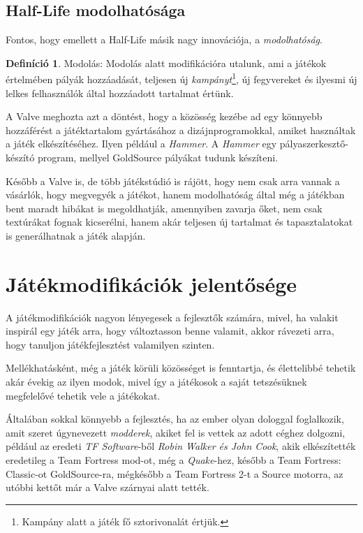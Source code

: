 \documentclass[]{thesis-ekf}
\theoremstyle{definition}
\newtheorem{definicio}{Definíció}[chapter]
\begin{document}
	\subsection{Half-Life modolhatósága}
	Fontos, hogy emellett a Half-Life másik nagy innovációja, a \emph{modolhatóság}.
	\begin{definicio}
		Modolás:
		Modolás alatt modifikációra utalunk, ami a játékok értelmében pályák hozzáadását, teljesen új \emph{kampányt}\footnote{Kampány alatt a játék fő sztorivonalát értjük.}, új fegyvereket és ilyesmi új lelkes felhasználók által hozzáadott tartalmat értünk.
	\end{definicio}

	A Valve meghozta azt a döntést, hogy a közösség kezébe ad egy könnyebb hozzáférést a játéktartalom gyártásához a dizájnprogramokkal, amiket használtak a játék elkészítéséhez.
	Ilyen például a \emph{Hammer}. A \emph{Hammer} egy pályaszerkesztő-készító program, mellyel GoldSource pályákat tudunk készíteni.
	
	Később a Valve is, de több játékstúdió is rájött, hogy nem csak arra vannak a vásárlók, hogy megvegyék a játékot, hanem modolhatóság által még a játékban bent maradt hibákat is megoldhatják, amennyiben zavarja őket, nem csak textúrákat fognak kicserélni, hanem akár teljesen új tartalmat és tapasztalatokat is generálhatnak a játék alapján.
	
	\section{Játékmodifikációk jelentősége}
	
	A játékmodifikációk nagyon lényegesek a fejlesztők számára, mivel, ha valakit inspirál egy játék arra, hogy változtasson benne valamit, akkor rávezeti arra, hogy tanuljon játékfejlesztést valamilyen szinten.
	
	Mellékhatásként, még a játék körüli közösséget is fenntartja, és élettelibbé tehetik akár évekig az ilyen modok, mivel így a játékosok a saját tetszésüknek megfelelővé tehetik vele a játékokat.
	
	Általában sokkal könnyebb a fejlesztés, ha az ember olyan dologgal foglalkozik, amit szeret úgynevezett \emph{modderek}, akiket fel is vettek az adott céghez dolgozni, például az eredeti \emph{TF Software}-ből \emph{Robin Walker és John Cook}, akik elkészítették eredetileg a Team Fortress mod-ot, még a \emph{Quake}-hez, később a Team Fortress: Classic-ot GoldSource-ra, mégkésőbb a Team Fortress 2-t a Source motorra, az utóbbi kettőt már a Valve szárnyai alatt tették.
	
\end{document}
